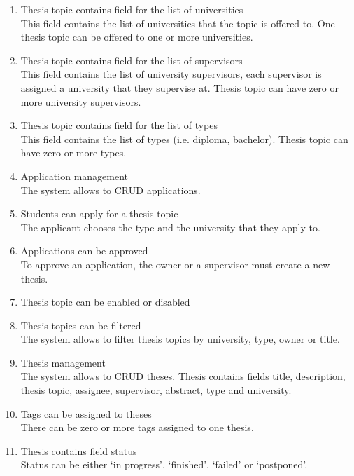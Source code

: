 \begin{enumerate}
    \item Thesis topic contains field for the list of universities\\
    This field contains the list of universities that the topic is offered to. One thesis topic can be offered to one or more universities.

    \item Thesis topic contains field for the list of supervisors\\
    This field contains the list of university supervisors, each supervisor is assigned a university that they supervise at. Thesis topic can have zero or more university supervisors.

    \item Thesis topic contains field for the list of types\\
    This field contains the list of types (i.e. diploma, bachelor). Thesis topic can have zero or more types.

    \item Application management\\
    The system allows to CRUD applications.

    \item Students can apply for a thesis topic\\
    The applicant chooses the type and the university that they apply to.

    \item Applications can be approved\\
    To approve an application, the owner or a supervisor must create a new thesis.

    \item Thesis topic can be enabled or disabled

    \item Thesis topics can be filtered\\
    The system allows to filter thesis topics by university, type, owner or title.

    \item Thesis management\\
    The system allows to CRUD theses. Thesis contains fields title, description, thesis topic, assignee, supervisor, abstract, type and university.

    \item Tags can be assigned to theses\\
    There can be zero or more tags assigned to one thesis.

    \item Thesis contains field status\\
    Status can be either `in progress', `finished', `failed' or `postponed'.


\end{enumerate}
